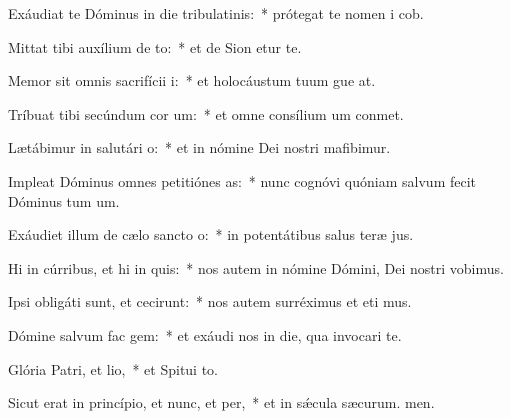 \item Exáudiat te Dóminus in die tribulatinis:~* prótegat te nomen i cob.
\item Mittat tibi auxílium de to:~* et de Sion etur te.
\item Memor sit omnis sacrifícii i:~* et holocáustum tuum gue at.
\item Tríbuat tibi secúndum cor um:~* et omne consílium um conmet.
\item Lætábimur in salutári o:~* et in nómine Dei nostri mafibimur.
\item Impleat Dóminus omnes petitiónes as:~* nunc cognóvi quóniam salvum fecit Dóminus tum um.
\item Exáudiet illum de cælo sancto o:~* in potentátibus salus teræ jus.
\item Hi in cúrribus, et hi in quis:~* nos autem in nómine Dómini, Dei nostri vobimus.
\item Ipsi obligáti sunt, et cecirunt:~* nos autem surréximus et eti mus.
\item Dómine salvum fac gem:~* et exáudi nos in die, qua invocari te.
\item Glória Patri, et lio,~* et Spitui to.
\item Sicut erat in princípio, et nunc, et per,~* et in sǽcula sæcurum. men.
